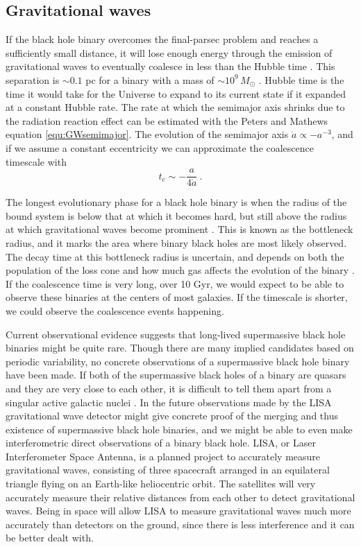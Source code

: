 \documentclass[english, oneside]{HYgradu}
\begin{document}
\subsection{Gravitational waves}

If the black hole binary overcomes the final-parsec problem and reaches a sufficiently small distance, it will lose enough energy through the emission of gravitational waves to eventually coalesce in less than the Hubble time \citep{milosavljevic:2003}. This separation is $\sim 0.1$ pc for a binary with a mass of $\sim 10^9 \, M_\odot$ \citep{rantala:2018}. Hubble time is the time it would take for the Universe to expand to its current state if it expanded at a constant Hubble rate. The rate at which the semimajor axis shrinks due to the radiation reaction effect can be estimated with the Peters and Mathews equation \eqref{equ:GWsemimajor}. The evolution of the semimajor axis $\dot{a} \propto -a^{-3}$, and if we assume a constant eccentricity we can approximate the coalescence timescale with \citep{bt-galdyn}
\begin{equation}
t_c \sim -\frac{a}{4\dot{a}} \ .
\end{equation}

The longest evolutionary phase for a black hole binary is when the radius of the bound system is below that at which it becomes hard, but still above the radius at which gravitational waves become prominent \citep{begelman:1980}. This is known as the bottleneck radius, and it marks the area where binary black holes are most likely observed. The decay time at this bottleneck radius is uncertain, and depends on both the population of the loss cone and how much gas affects the evolution of the binary \citep{bt-galdyn}. If the coalescence time is very long, over 10 Gyr, we would expect to be able to observe these binaries at the centers of most galaxies. If the timescale is shorter, we could observe the coalescence events happening.

Current observational evidence suggests that long-lived supermassive black hole binaries might be quite rare. Though there are many implied candidates based on periodic variability, no concrete observations of a supermassive black hole binary have been made. If both of the supermassive black holes of a binary are quasars and they are very close to each other, it is difficult to tell them apart from a singular active galactic nuclei \citep{roedig:2014}. In the future observations made by the LISA gravitational wave detector might give concrete proof of the merging and thus existence of supermassive black hole binaries, and we might be able to even make interferometric direct observations of a binary black hole. LISA, or Laser Interferometer Space Antenna, is a planned project to accurately measure gravitational waves, consisting of three spacecraft arranged in an equilateral triangle flying on an Earth-like heliocentric orbit. The satellites will very accurately measure their relative distances from each other to detect gravitational waves. Being in space will allow LISA to measure gravitational waves much more accurately than detectors on the ground, since there is less interference and it can be better dealt with.
\end{document}
